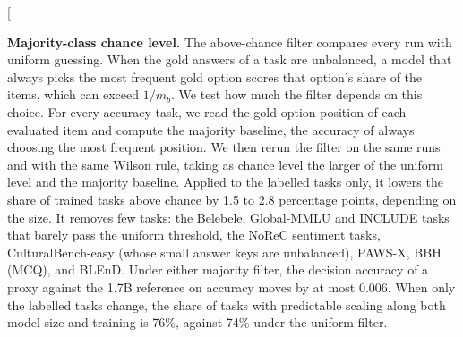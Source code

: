 \clearpage
\twocolumn[{%
\rqparent

\noindent\begin{minipage}[t]{0.485\textwidth}
\vspace{0pt}
\textbf{Majority-class chance level.}
\label{app:rq00_majority_chance}
The above-chance filter compares every run with uniform guessing. When the gold answers of a task are unbalanced, a model that always picks the most frequent gold option scores that option's share of the items, which can exceed $1/m_b$. We test how much the filter depends on this choice. For every accuracy task, we read the gold option position of each evaluated item and compute the majority baseline, the accuracy of always choosing the most frequent position. We then rerun the filter on the same runs and with the same Wilson rule, taking as chance level the larger of the uniform level and the majority baseline. 
Applied to the labelled tasks only, it lowers the share of trained tasks above chance by 1.5 to 2.8 percentage points, depending on the size. It removes few tasks: the Belebele, Global-MMLU and INCLUDE tasks that barely pass the uniform threshold, the NoReC sentiment tasks, CulturalBench-easy (whose small answer keys are unbalanced), PAWS-X, BBH (MCQ), and BLEnD. Under either majority filter, the decision accuracy of a proxy against the 1.7B reference on accuracy moves by at most 0.006. When only the labelled tasks change, the share of tasks with predictable scaling along both model size and training is 76\%, against 74\% under the uniform filter.


\end{minipage}\hfill
\begin{minipage}[t]{0.485\textwidth}
\vspace{0pt}


\end{minipage}}
